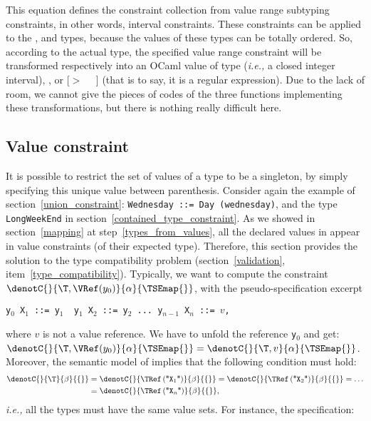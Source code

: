 \medskip

This equation defines the constraint collection from value range
subtyping constraints, in other words, interval constraints. These
constraints can be applied to the \kwdINTEGER, \kwdREAL{} and
\String{} types, because the values of these types can be totally
ordered. So, according to the actual type, the specified value range
constraint will be transformed respectively into an OCaml value of
type  (\emph{i.e.,} a closed integer
interval), , or \textsf{[$>$} \Regexp \,
 \, \textsf{]} (that is to say, it
is a regular expression). Due to the lack of room, we cannot give the
pieces of codes of the three functions implementing these
transformations, but there is nothing really difficult here.


\subsection{Value constraint}\label{value_constraint}

It is possible to restrict the set of values of a type to be a
singleton, by simply specifying this unique value between
parenthesis. Consider again the example of
section~\ref{union_constraint}: \texttt{\small Wednesday ::= Day
(}\texttt{\small wednesday}\texttt{\small )}, and the type
\texttt{\small LongWeekEnd} in
section~\ref{contained_type_constraint}. As we showed in
section~\ref{mapping} at step~\ref{types_from_values}, all the
declared values in \core appear in value constraints (of their
expected type). Therefore, this section provides the solution to the
type compatibility problem (section~\ref{validation},
item~\ref{type_compatibility}). Typically, we want to compute the
constraint $\denotC{}{\T, \VRef (y_0)}{\alpha}{\TSEmap{}}$, with the
pseudo-specification excerpt
\begin{center}
\tt y$_0$ X$_1$ ::= y$_1$ \ y$_1$ X$_2$ ::= y$_2$ ... y$_{n-1}$ X$_n$
::= $v$,
\end{center}
where $v$ is not a value reference. We have to unfold the reference
\texttt{y$_0$} and get: $\denotC{}{\T, \VRef (y_0)}{\alpha}{\TSEmap{}}
= \denotC{}{\T, v}{\alpha}{\TSEmap{}}$. Moreover, the semantic model
of \ASN implies that the following condition must hold:
\begin{align*}
\denotC{}{\T}{\beta}{\{\}} &= \denotC{}{\TRef \,
  (\textsf{"}\texttt{X}_1\textsf{"})}{\beta}{\{\}} = \denotC{}{\TRef
  \, (\textsf{"}\texttt{X}_2\textsf{"})}{\beta}{\{\}} = \ldots\\
 &=
\denotC{}{\TRef \, (\textsf{"}\texttt{X}_n\textsf{"})}{\beta}{\{\}},
\end{align*}
\emph{i.e.,} all the types must have the same value sets. For
instance, the \core specification:

